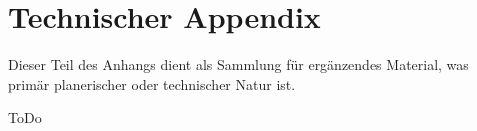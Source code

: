 \section{Technischer Appendix}
\label{sec:technicalAppendix}

Dieser Teil des Anhangs dient als Sammlung f\"ur erg\"anzendes Material, was prim\"ar planerischer oder technischer Natur ist.


ToDo